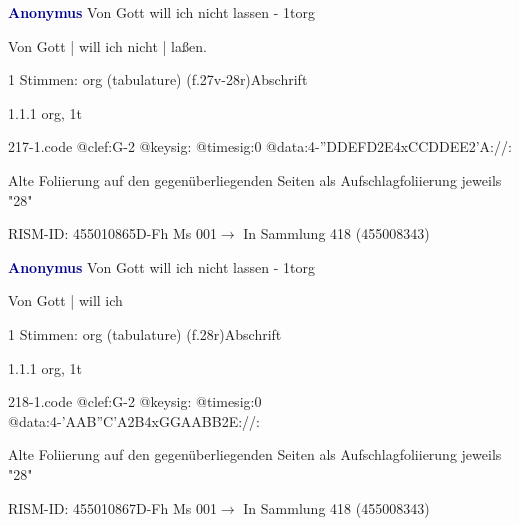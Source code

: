 \documentclass[twocolumn]{book}
\begin{document}
\par \vspace{7pt} \textcolor{darkblue}{\textbf{Anonymus  }}\hfillplus{\textbf{[217]}}\newline Von Gott will ich nicht lassen - 1t\newline org
\par \begin{itshape}[f.27v, at left:] Von Gott | will ich nicht | laßen.\end{itshape} 
\par \textcolor{darkblue}{}  1 Stimmen: org (tabulature)  (f.27v-28r)\newline Abschrift
\par 1.1.1  org, 1t  
\begin{filecontents*}{217-1.code}
@clef:G-2
@keysig:
@timesig:0
@data:4-''DDEFD2E4xCCDDEE2'A://:
\end{filecontents*}
\newline
%
\par Alte Foliierung auf den gegenüberliegenden Seiten als Aufschlagfoliierung jeweils "28"
\par RISM-ID: 455010865\newline D-Fh  Ms 001\newline $\rightarrow$ In Sammlung 418 (455008343)
      
\par \vspace{7pt} \textcolor{darkblue}{\textbf{Anonymus  }}\hfillplus{\textbf{[218]}}\newline Von Gott will ich nicht lassen - 1t\newline org
\par \begin{itshape}[f.28r, at left:] Von Gott | will ich\end{itshape} 
\par \textcolor{darkblue}{}  1 Stimmen: org (tabulature)  (f.28r)\newline Abschrift
\par 1.1.1  org, 1t  
\begin{filecontents*}{218-1.code}
@clef:G-2
@keysig:
@timesig:0
@data:4-'AAB''C'A2B4xGGAABB2E://:
\end{filecontents*}
\newline
%
\par Alte Foliierung auf den gegenüberliegenden Seiten als Aufschlagfoliierung jeweils "28"
\par RISM-ID: 455010867\newline D-Fh  Ms 001\newline $\rightarrow$ In Sammlung 418 (455008343)
      
\end{document}
